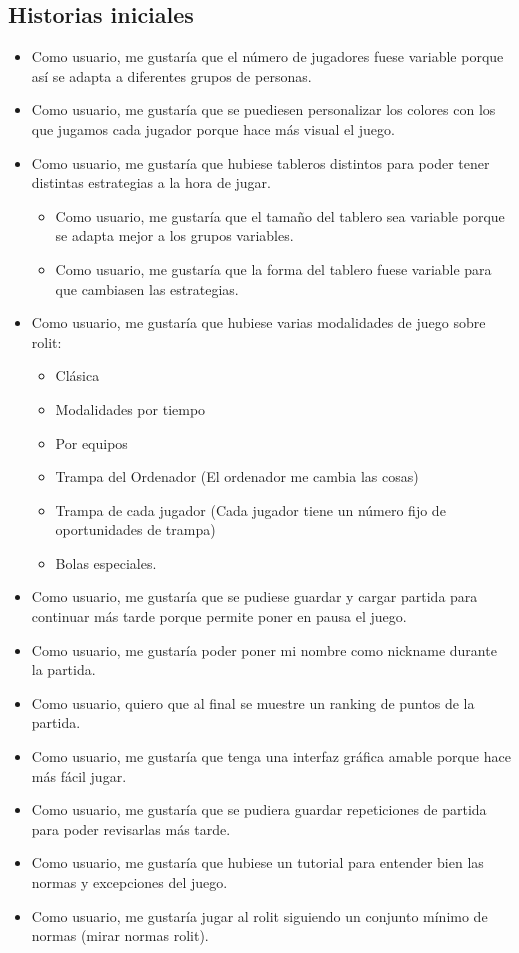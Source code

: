 \documentclass[../../FINAL/Scrum/SCRUM.tex]{subfiles}
\begin{document}
\subsection{Historias iniciales}
\begin{itemize}
\item
  Como usuario, me gustaría que el número de jugadores fuese variable
  porque así se adapta a diferentes grupos de personas.
\item
  Como usuario, me gustaría que se puediesen personalizar los colores
  con los que jugamos cada jugador porque hace más visual el juego.
\item
  Como usuario, me gustaría que hubiese tableros distintos para poder
  tener distintas estrategias a la hora de jugar.

  \begin{itemize}
  \item
    Como usuario, me gustaría que el tamaño del tablero sea variable
    porque se adapta mejor a los grupos variables.
  \item
    Como usuario, me gustaría que la forma del tablero fuese variable
    para que cambiasen las estrategias.
  \end{itemize}
\item
  Como usuario, me gustaría que hubiese varias modalidades de juego
  sobre rolit:

  \begin{itemize}
  \item
    Clásica
  \item
    Modalidades por tiempo
  \item
    Por equipos
  \item
    Trampa del Ordenador (El ordenador me cambia las cosas)
  \item
    Trampa de cada jugador (Cada jugador tiene un número fijo de
    oportunidades de trampa)
  \item
    Bolas especiales.
  \end{itemize}
\item
  Como usuario, me gustaría que se pudiese guardar y cargar partida para
  continuar más tarde porque permite poner en pausa el juego.
\item
  Como usuario, me gustaría poder poner mi nombre como nickname durante
  la partida.
\item
  Como usuario, quiero que al final se muestre un ranking de puntos de
  la partida.
\item
  Como usuario, me gustaría que tenga una interfaz gráfica amable porque
  hace más fácil jugar.
\item
  Como usuario, me gustaría que se pudiera guardar repeticiones de
  partida para poder revisarlas más tarde.
\item
  Como usuario, me gustaría que hubiese un tutorial para entender bien
  las normas y excepciones del juego.
\item
  Como usuario, me gustaría jugar al rolit siguiendo un conjunto mínimo
  de normas (mirar normas rolit).
\end{itemize}
\end{document}
